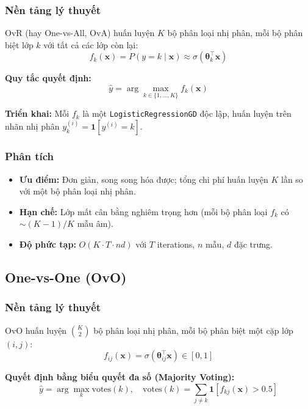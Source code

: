 \documentclass[12pt, a4paper]{article}
\begin{document}
\subsubsection{Nền tảng lý thuyết}

OvR (hay One-vs-All, OvA) huấn luyện $K$ bộ phân loại nhị phân, mỗi bộ phân biệt lớp $k$ với tất cả các lớp còn lại:
$$f_k(\mathbf{x}) = P(y=k \mid \mathbf{x}) \approx \sigma(\boldsymbol{\theta}_k^\top \mathbf{x})$$

\textbf{Quy tắc quyết định:}
$$\hat{y} = \arg\max_{k \in \{1,\ldots,K\}} f_k(\mathbf{x})$$

\textbf{Triển khai:} Mỗi $f_k$ là một \texttt{LogisticRegressionGD} độc lập, huấn luyện trên nhãn nhị phân $y_k^{(i)} = \mathbf{1}[y^{(i)} = k]$.

\subsubsection{Phân tích}
\begin{itemize}
  \item \textbf{Ưu điểm:} Đơn giản, song song hóa được; tổng chi phí huấn luyện $K$ lần so với một bộ phân loại nhị phân.
  \item \textbf{Hạn chế:} Lớp mất cân bằng nghiêm trọng hơn (mỗi bộ phân loại $f_k$ có $\sim(K-1)/K$ mẫu âm).
  \item \textbf{Độ phức tạp:} $O(K \cdot T \cdot nd)$ với $T$ iterations, $n$ mẫu, $d$ đặc trưng.
\end{itemize}


\subsection{One-vs-One (OvO)}
\label{ssec:ovo}

\subsubsection{Nền tảng lý thuyết}

OvO huấn luyện $\binom{K}{2}$ bộ phân loại nhị phân, mỗi bộ phân biệt một cặp lớp $(i, j)$:
$$f_{ij}(\mathbf{x}) = \sigma(\boldsymbol{\theta}_{ij}^\top \mathbf{x}) \in [0,1]$$

\textbf{Quyết định bằng biểu quyết đa số (Majority Voting):}
$$\hat{y} = \arg\max_{k} \text{votes}(k), \quad \text{votes}(k) = \sum_{j \neq k} \mathbf{1}[f_{kj}(\mathbf{x}) > 0.5]$$
\end{document}
